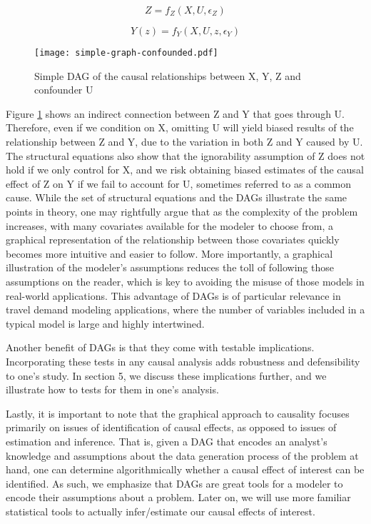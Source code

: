 \[Z = f_Z(X, U, \epsilon_Z)  \]

\[Y(z) = f_Y(X, U, z, \epsilon_Y)  \]

\begin{figure}[h!]
   \centering
   \texttt{[image: simple-graph-confounded.pdf]}
   \caption{Simple DAG of the causal relationships between X, Y, Z and confounder U}
   \label{fig:simple-graph-confounded}
\end{figure}

Figure \ref{fig:simple-graph-confounded} shows an indirect connection between Z and Y that goes through U.
Therefore, even if we condition on X, omitting U will yield biased results of the relationship between Z and Y, due to the variation in both Z and Y caused by U.
The structural equations also show that the ignorability assumption of Z does not hold if we only control for X, and we risk obtaining biased estimates of the causal effect of Z on Y if we fail to account for U, sometimes referred to as a common cause.
While the set of structural equations and the DAGs illustrate the same points in theory, one may rightfully argue that as the complexity of the problem increases, with many covariates available for the modeler to choose from, a graphical representation of the relationship between those covariates quickly becomes more intuitive and easier to follow. 
More importantly, a graphical illustration of the modeler's assumptions reduces the toll of following those assumptions on the reader, which is key to avoiding the misuse of those models in real-world applications.
This advantage of DAGs is of particular relevance in travel demand modeling applications, where the number of variables included in a typical model is large and highly intertwined. 

Another benefit of DAGs is that they come with testable implications.
Incorporating these tests in any causal analysis adds robustness and defensibility to one's study.
In section 5, we discuss these implications further, and we illustrate how to tests for them in one's analysis.

Lastly, it is important to note that the graphical approach to causality focuses
primarily on issues of identification of causal effects, as opposed to issues of estimation and inference. That is, given a
DAG that encodes an analyst's knowledge and assumptions about the data generation process of the problem at hand, one can determine algorithmically whether a causal effect of interest can be identified. 
As such, we emphasize that DAGs are great tools
for a modeler to encode their assumptions about a problem.
Later on, we will use more familiar statistical tools to actually infer/estimate our causal effects of interest.

